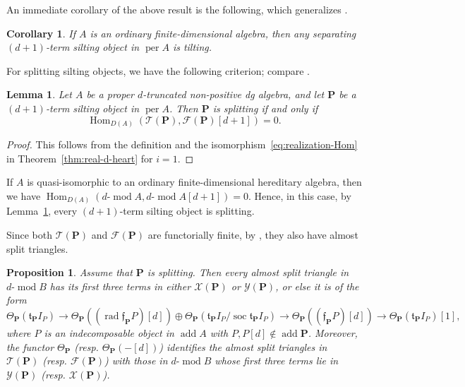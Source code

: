 \documentclass[11pt,a4paper,reqno]{amsart}
\theoremstyle{plain}
\newtheorem{lemma}[theorem]{Lemma}
\newtheorem{corollary}[theorem]{Corollary}
\newtheorem{proposition}[theorem]{Proposition}
\numberwithin{equation}{section}
\theoremstyle{definition}
\providecommand{\add}{\operatorname{add}}
\providecommand{\per}{\operatorname{per}}
\renewcommand{\mod}{\operatorname{mod}}
\newcommand{\Hom}{\operatorname{Hom}}
\newcommand{\emod}[2]{#1\text{-}\!\mod #2}
\newcommand{\PP}{\mathbf{P}}
\newcommand{\T}{\mathcal{T}}
\newcommand{\F}{\mathcal{F}}
\newcommand{\X}{\mathcal{X}}
\newcommand{\Y}{\mathcal{Y}}
\begin{document}
An immediate corollary of the above result is the following, which generalizes \cite[Proposition~5.7]{BZ}.

\begin{corollary}\label{cor:separating}
   If $A$ is an ordinary finite-dimensional algebra, then any separating $(d+1)$-term silting object in $\per A$ is tilting.
\end{corollary}

For splitting silting objects, we have the following criterion;
compare \cite[Lemma~5.5]{BZ}.

\begin{lemma}\label{lem:splitting}
Let $A$ be a proper $d$-truncated non-positive dg algebra, and let $\PP$ be a $(d+1)$-term silting object in $\per A$. Then $\PP$ is splitting if and only if
\[
 \Hom_{D(A)}(\T(\PP),\F(\PP)[d+1])=0.
\]
\end{lemma}

\begin{proof}
This follows from the definition and the isomorphism~\eqref{eq:realization-Hom} in Theorem~\ref{thm:real-d-heart} for $i=1$.
\end{proof}

If $A$ is quasi-isomorphic to an ordinary finite-dimensional hereditary algebra, then we have $\Hom_{D(A)}(\emod{d}{A},\emod{d}{A}[d+1])=0$. Hence, in this case, by Lemma~\ref{lem:splitting}, every $(d+1)$-term silting object is splitting.

Since both $\T(\PP)$ and $\F(\PP)$ are functorially finite, by \cite[Theorem~5.14]{INP}, they also have almost split triangles.

\begin{proposition}\label{prop:AR-splitting}
Assume that $\PP$ is splitting. Then every almost split triangle in $\emod{d}{B}$ has its first three terms in either $\X(\PP)$ or $\Y(\PP)$, or else it is of the form
  \[\Theta_{\PP}(\mathfrak{t}_{\PP}I_P)\to\Theta_{\PP}((\operatorname{rad}\mathfrak{f}_{\PP}P)[d])\oplus\Theta_{\PP}(\mathfrak{t}_{\PP}I_P/\operatorname{soc}\mathfrak{t}_{\PP}I_P)\to\Theta_{\PP}((\mathfrak{f}_{\PP}P)[d])
    \to\Theta_{\PP}(\mathfrak{t}_{\PP}I_P)[1],
  \]
  where $P$ is an indecomposable object in $\add A$ with $P,P[d]\notin\add\PP$. Moreover, the functor $\Theta_{\PP}$ (resp. $\Theta_{\PP}(-[d])$) identifies the almost split triangles in $\T(\PP)$ (resp. $\F(\PP)$) with those in $\emod{d}{B}$ whose first three terms lie in $\Y(\PP)$ (resp. $\X(\PP)$).
\end{proposition}
\end{document}
